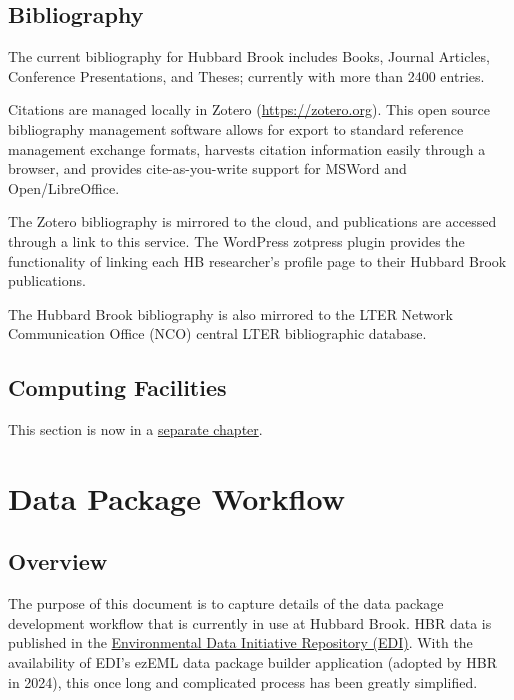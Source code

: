 \documentclass[
  letterpaper,
  DIV=11,
  numbers=noendperiod]{scrreprt}
\begin{document}
\section{Bibliography}\label{bibliography}

The current bibliography for Hubbard Brook includes Books, Journal
Articles, Conference Presentations, and Theses; currently with more than
2400 entries.

Citations are managed locally in Zotero
(\href{https://zotero.org/}{https://zotero.org}). This open source
bibliography management software allows for export to standard reference
management exchange formats, harvests citation information easily
through a browser, and provides cite-as-you-write support for MSWord and
Open/LibreOffice.

The Zotero bibliography is mirrored to the cloud, and publications are
accessed through a link to this service. The WordPress zotpress plugin
provides the functionality of linking each HB researcher's profile page
to their Hubbard Brook publications.

The Hubbard Brook bibliography is also mirrored to the LTER Network
Communication Office (NCO) central LTER bibliographic database.

\section{Computing
Facilities}\label{appendix-1.-esrcunh-computing-facilities}

This section is now in a \href{UNH_computer_support.qmd}{separate
chapter}.


\chapter{Data Package Workflow}\label{data-package-workflow}

\section{Overview}\label{overview-1}

The purpose of this document is to capture details of the data package
development workflow that is currently in use at Hubbard Brook. HBR data
is published in the \href{https://edirepository.org}{Environmental Data
Initiative Repository (EDI)}. With the availability of EDI's ezEML data
package builder application (adopted by HBR in 2024), this once long and
complicated process has been greatly simplified.
\end{document}
